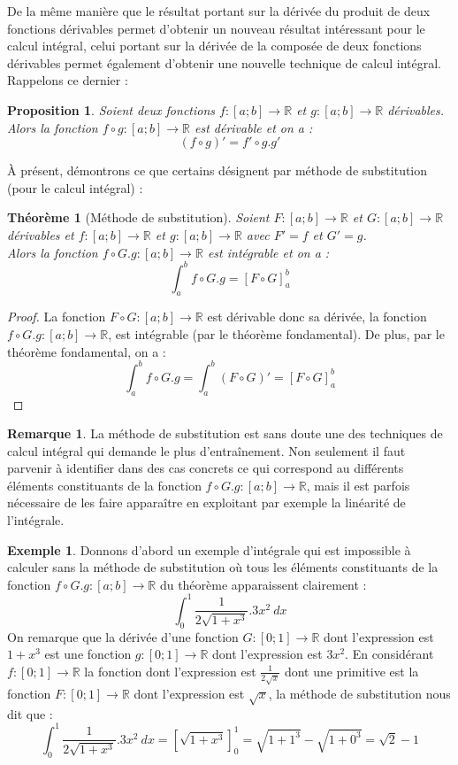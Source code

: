 \documentclass[a4paper,fontsize=13pt]{scrreprt}
\theoremstyle{plain}
\newtheorem{thé}[subsection]{Théorème}
\newtheorem{pro}[subsection]{Proposition}
\theoremstyle{definition}
\newtheorem{exe}[subsection]{Exemple}
\newtheorem{rema}[subsection]{Remarque}
\newcommand{\rr}{\mathbb{R}}
\begin{document}
De la même manière que le résultat portant sur la dérivée du produit de deux fonctions dérivables permet d'obtenir un nouveau résultat intéressant pour le calcul intégral, celui portant sur la dérivée de la composée de deux fonctions dérivables permet également d'obtenir une nouvelle technique de calcul intégral. Rappelons ce dernier :
\begin{pro}
Soient deux fonctions $f : [a;b] \to \rr$ et $g : [a;b] \to \rr$ dérivables. \\
Alors la fonction $f \circ g : [a;b] \to \rr$ est dérivable et on a :
$$(f \circ g)' = f' \circ g . g'$$
\end{pro}
À présent, démontrons ce que certains désignent par \og méthode de substitution (pour le calcul intégral) \fg{} :
\begin{thé} [Méthode de substitution]
Soient $F : [a;b] \to \rr$ et $G : [a;b] \to \rr$ dérivables et $f : [a;b] \to \rr$ et $g : [a;b] \to \rr$ avec $F'=f$ et $G'=g$. \\
Alors la fonction $f \circ G . g : [a;b] \to \rr$ est intégrable et on a :
$$\int_a^b f \circ G . g = [F \circ G]_a^b$$
\end{thé}
\begin{proof}
La fonction $F \circ G : [a;b] \to \rr$ est dérivable donc sa dérivée, la fonction $f \circ G . g : [a;b] \to \rr$, est intégrable (par le théorème fondamental). De plus, par le théorème fondamental, on a :
$$\int_a^b f \circ G . g = \int_a^b (F \circ G)' = [F \circ G]_a^b$$
\end{proof}
\begin{rema}
La méthode de substitution est sans doute une des techniques de calcul intégral qui demande le plus d'entraînement. Non seulement il faut parvenir à identifier dans des cas concrets ce qui correspond au différents éléments constituants de la fonction $f \circ G . g : [a;b] \to \rr$, mais il est parfois nécessaire de les faire apparaître en exploitant par exemple la linéarité de l'intégrale.
\end{rema}
\begin{exe}
Donnons d'abord un exemple d'intégrale qui est impossible à calculer sans la méthode de substitution où tous les éléments constituants de la fonction $f \circ G . g : [a;b] \to \rr$ du théorème apparaissent clairement :
$$\int_{0}^{1} \frac{1}{2\sqrt{1+x^3}}.3x^2~dx$$
On remarque que la dérivée d'une fonction $G : [0;1] \to \rr$ dont l'expression est $1+x^3$ est une fonction $g : [0;1] \to \rr$ dont l'expression est $3x^2$. En considérant $f : [0;1] \to \rr$ la fonction dont l'expression est $\frac{1}{2\sqrt{x}}$ dont une primitive est la fonction $F : [0;1] \to \rr$ dont l'expression est $\sqrt{x}$, la méthode de substitution nous dit que :
$$\int_{0}^{1} \frac{1}{2\sqrt{1+x^3}}.3x^2~dx = [\sqrt{1+x^3}]_0^1 = \sqrt{1+1^3} - \sqrt{1+0^3}= \sqrt{2} - 1$$
\end{exe}
\end{document}
